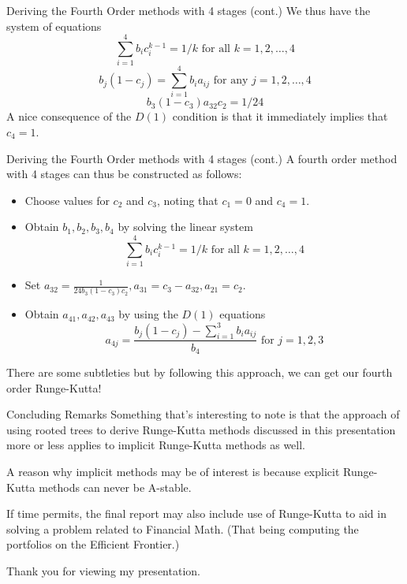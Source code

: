 \documentclass{beamer}
\begin{document}
\begin{frame}{Deriving the Fourth Order methods with 4 stages (cont.)}
We thus have the system of equations
$$\sum_{i = 1}^4{b_ic_i^{k - 1}} = 1/k \mbox{ for all } k = 1, 2, \dots, 4$$
$$b_j(1 - c_j) = \sum_{i = 1}^4{b_ia_{ij}} \mbox{ for any } j = 1, 2, \dots, 4$$
$$b_3(1 - c_3)a_{32}c_2 = 1/24$$ \newline
\pause
A nice consequence of the $D(1)$ condition is that it immediately implies that $c_4 = 1$.
\end{frame}

\begin{frame}{Deriving the Fourth Order methods with 4 stages (cont.)}
A fourth order method with 4 stages can thus be constructed as follows:
\begin{itemize}
\pause \item Choose values for $c_2$ and $c_3$, noting that $c_1 = 0$ and $c_4 = 1$.
\pause \item Obtain $b_1, b_2, b_3, b_4$ by solving the linear system
$$\sum_{i = 1}^4{b_ic_i^{k - 1}} = 1/k \mbox{ for all } k = 1, 2, \dots, 4$$
\pause \item Set $a_{32} = \frac{1}{24b_3(1 - c_3)c_2}, a_{31} = c_3 - a_{32}, a_{21} = c_2$. 
\pause \item Obtain $a_{41}, a_{42}, a_{43}$ by using the $D(1)$ equations
$$a_{4j} = \frac{b_j(1 - c_j) - \sum_{i = 1}^{3}{b_ia_{ij}}}{b_4} \mbox{ for } j = 1, 2, 3$$
\end{itemize}
\pause
There are some subtleties but by following this approach, we can get our fourth order Runge-Kutta!
\end{frame}

\begin{frame}{Concluding Remarks}
Something that's interesting to note is that the approach of using rooted trees to derive
Runge-Kutta methods discussed in this presentation more or less applies to implicit 
Runge-Kutta methods as well. \newline

A reason why implicit methods may be of interest is because explicit Runge-Kutta methods 
can never be A-stable. \newline

If time permits, the final report may also include use of Runge-Kutta to aid in solving a problem related to Financial Math.
(That being computing the portfolios on the Efficient Frontier.) \newline

Thank you for viewing my presentation. \smiley{}
\end{frame}
\end{document}
